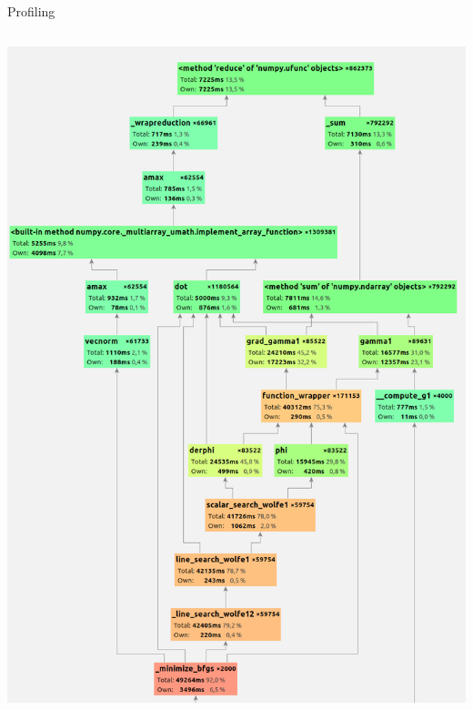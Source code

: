 \documentclass[aspectratio=1610,usenames,dvipsnames]{beamer}
\begin{document}
\begin{frame}{Profiling}
\begin{columns}
    \begin{column}{0.49\textwidth}
        \begin{center}
            \includegraphics[height=0.88\textheight]{img/profiling3.png}
        \end{center}
    \end{column}
\end{columns}
    
\end{frame}
\end{document}
